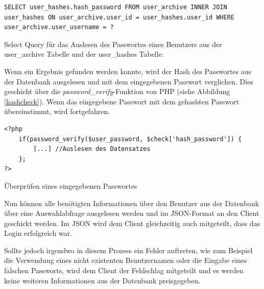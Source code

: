 \documentclass[../main.tex]{subfiles}
\begin{document}
	 \begin{code}
	 	\begin{center}
	 		\begin{verbatim}
SELECT user_hashes.hash_password FROM user_archive INNER JOIN user_hashes ON user_archive.user_id = user_hashes.user_id WHERE user_archive.user_username = ?
	 		\end{verbatim}
	 		\caption{Select Query für das Auslesen des Passwortes eines Benutzers aus der user\_archive Tabelle und der user\_hashes Tabelle.}\label{SQL:SALT}
	 	\end{center}
	 \end{code}
 
 	Wenn ein Ergebnis gefunden werden konnte, wird der Hash des Passwortes aus der Datenbank ausgelesen und mit dem eingegebenen Passwort verglichen. Dies geschieht über die \emph{password\_verify}-Funktion von PHP (siehe Abbildung \ref{hashcheck}). Wenn das eingegebene Passwort mit dem gehashten Passwort übereinstimmt, wird fortgefahren. 
 	
\begin{code}
 	\begin{center}
 		\begin{verbatim}
<?php
	if(password_verify($user_password, $check['hash_password']) {
		[...] //Auslesen des Datensatzes
	};
?>
 			\end{verbatim}
 			\caption{Überprüfen eines eingegebenen Passwortes}\label{hashcheck}
 		\end{center}
 	\end{code}
 	
 	Nun können alle benötigten Informationen über den Benutzer aus der Datenbank über eine Auswahlabfrage ausgelesen werden und im JSON-Format an den Client geschickt werden. Im JSON wird dem Client gleichzeitig auch mitgeteilt, dass das Login erfolgreich war.
	 
	Sollte jedoch irgendwo in diesem Prozess ein Fehler auftreten, wie zum Beispiel die Verwendung eines nicht existenten Benutzernamen oder die Eingabe eines falschen Passworts, wird dem Client der Fehlschlag mitgeteilt und es werden keine weiteren Informationen aus der Datenbank preisgegeben.
	
	 
\end{document}
